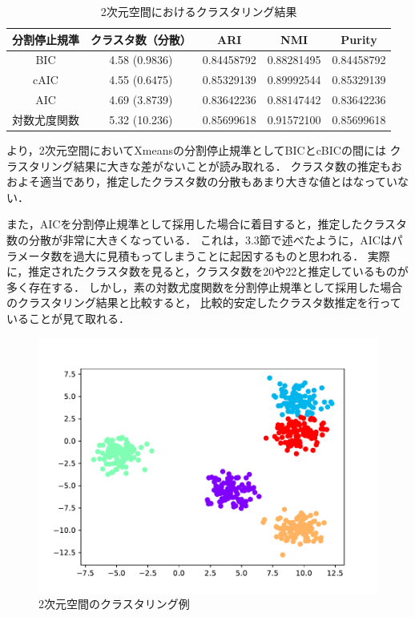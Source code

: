 \begin{table}[htb]
  \centering
  \caption{2次元空間におけるクラスタリング結果}
  \label{table:2dim}
  \begin{tabular}{|c|c|c|c|c|} \hline
    分割停止規準 & クラスタ数（分散） & ARI & NMI & Purity \\\hline
    BIC & 4.58 (0.9836) & 0.84458792 & 0.88281495 & 0.84458792\\
    cAIC & 4.55 (0.6475) & 0.85329139 & 0.89992544 & 0.85329139\\
    AIC & 4.69 (3.8739) & 0.83642236 & 0.88147442 & 0.83642236\\
    対数尤度関数 & 5.32 (10.236) & 0.85699618 & 0.91572100 & 0.85699618\\\hline 
  \end{tabular}
\end{table}

より，2次元空間においてXmeansの分割停止規準としてBICとcBICの間には
クラスタリング結果に大きな差がないことが読み取れる．
クラスタ数の推定もおおよそ適当であり，推定したクラスタ数の分散もあまり大きな値とはなっていない．

また，AICを分割停止規準として採用した場合に着目すると，推定したクラスタ数の分散が非常に大きくなっている．
これは，3.3節で述べたように，AICはパラメータ数を過大に見積もってしまうことに起因するものと思われる．
実際に，推定されたクラスタ数を見ると，クラスタ数を20や22と推定しているものが多く存在する．
しかし，素の対数尤度関数を分割停止規準として採用した場合のクラスタリング結果と比較すると，
比較的安定したクラスタ数推定を行っていることが見て取れる．

\begin{figure}[htbp]
  \begin{center}
    \includegraphics[width=0.7\linewidth]{./img/BIC_2.pdf}
      \caption{2次元空間のクラスタリング例}
      \label{fig:2dim}
  \end{center}
\end{figure}

